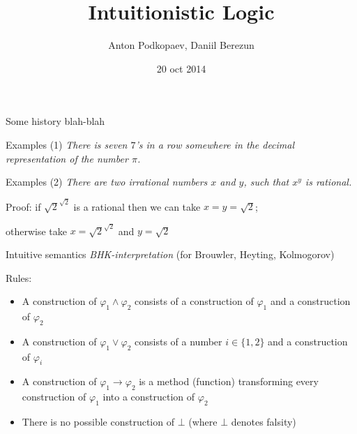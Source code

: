 \documentclass[sans]{beamer}
\begin{document}
\title
[Intuitionistic Logic]
{Intuitionistic Logic}

\author
[JBStuff]{Anton Podkopaev, Daniil Berezun}
\date [20-10-14]{20 oct 2014}

\begin{frame}[plain]
	\titlepage
\end{frame}

\begin{frame}{Some history blah-blah}
\end{frame}

\begin{frame}{Examples (1)}
  \emph{
    There is seven $7$'s in a row somewhere in
    the decimal representation
    of the number $\pi$.
  }
\end{frame}

\begin{frame}{Examples (2)}
  \emph{
    There are two irrational numbers $x$ and $y$, such that $x^y$ is rational.
  }
  \vfill
  \begin{block}{Proof:}
    if $\sqrt{2}^{\sqrt{2}}$ is a rational then we can take $x = y = \sqrt{2}$;

    otherwise take $x = \sqrt{2}^{\sqrt{2}}$ and $y = \sqrt{2}$
  \end{block}
\end{frame}

\begin{frame}{Intuitive semantics}
  \emph{BHK-interpretation} (for Brouwler, Heyting, Kolmogorov)

  \begin{block}{Rules:}
    \begin{itemize}
      \item A construction of $\varphi_1 \wedge \varphi_2$ consists of
            a construction of $\varphi_1$ and a construction of $\varphi_2$
      \item A construction of $\varphi_1 \vee \varphi_2$ consists of a
            number $i \in \{1, 2\}$ and a construction of $\varphi_i$
      \item A construction of $\varphi_1 \to \varphi_2$ is a method (function)
            transforming every construction of $\varphi_1$ into a construction
            of $\varphi_2$
      \item There is no possible construction of $\bot$ (where $\bot$ denotes falsity)
    \end{itemize}
  \end{block}
\end{frame}
\end{document}

